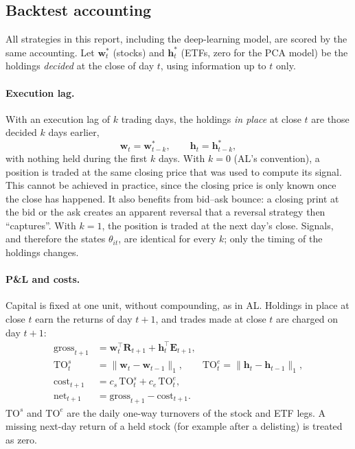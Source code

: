 \subsection{Backtest accounting}
\label{sec:method:accounting}

All strategies in this report, including the deep-learning model, are scored by the same
accounting. Let $\bm w^\ast_t$ (stocks) and $\bm h^\ast_t$ (ETFs, zero for the PCA model) be the
holdings \emph{decided} at the close of day $t$, using information up to $t$ only.

\paragraph{Execution lag.} With an execution lag of $k$ trading days, the holdings \emph{in
place} at close $t$ are those decided $k$ days earlier,
\begin{equation}
  \bm w_t = \bm w^\ast_{t-k}, \qquad \bm h_t = \bm h^\ast_{t-k},
  \label{eq:lag}
\end{equation}
with nothing held during the first $k$ days. With $k=0$ (AL's convention), a position is traded
at the same closing price that was used to compute its signal. This cannot be achieved in
practice, since the closing price is only known once the close has happened. It also benefits
from bid--ask bounce: a closing print at the bid or the ask creates an apparent reversal that a
reversal strategy then ``captures''. With $k=1$, the position is traded at the next day's close.
Signals, and therefore the states $\theta_{it}$, are identical for every $k$; only the timing of
the holdings changes.

\paragraph{P\&L and costs.} Capital is fixed at one unit, without compounding, as in AL. Holdings
in place at close $t$ earn the returns of day $t+1$, and trades made at close $t$ are charged on
day $t+1$:
\begin{align}
  \text{gross}_{t+1} &= \bm w_t^\top \bm R_{t+1} + \bm h_t^\top \bm E_{t+1}, \\
  \text{TO}^{s}_{t} &= \|\bm w_t - \bm w_{t-1}\|_1, \qquad
  \text{TO}^{e}_{t} = \|\bm h_t - \bm h_{t-1}\|_1, \\
  \text{cost}_{t+1} &= c_s\,\text{TO}^{s}_{t} + c_e\,\text{TO}^{e}_{t}, \\
  \text{net}_{t+1} &= \text{gross}_{t+1} - \text{cost}_{t+1}.
\end{align}
$\text{TO}^s$ and $\text{TO}^e$ are the daily one-way turnovers of the stock and ETF legs. A
missing next-day return of a held stock (for example after a delisting) is treated as zero.

